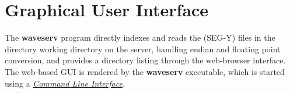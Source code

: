 \documentclass[letterpaper,10pt,english]{sphinxmanual}
\begin{document}

\begin{fulllineitems}
\label{cli:cmdoption-waveserv-d}
\end{fulllineitems}



\begin{fulllineitems}
\label{cli:cmdoption-waveserv-g}
\end{fulllineitems}



\begin{fulllineitems}
\label{cli:cmdoption-waveserv-k}
\end{fulllineitems}



\begin{fulllineitems}
\label{cli:cmdoption-waveserv-p}
\end{fulllineitems}



\chapter{Graphical User Interface}
\label{gui:gui}\label{gui::doc}\label{gui:graphical-user-interface}
The \textbf{waveserv} program directly indexes and reads the (SEG-Y) files in the directory working directory on the server, handling endian and floating point conversion, and provides a directory listing through the web-browser interface.  The web-based GUI is rendered by the \textbf{waveserv} executable, which is started using a {\hyperref[cli:cli]{\emph{Command Line Interface}}}.
\end{document}
